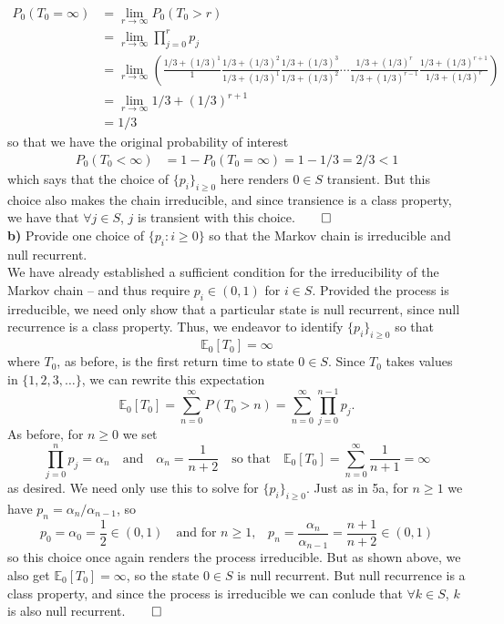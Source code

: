 \documentclass[11pt, letterpaper]{article}
\newcommand{\mbb}[1]{\mathbb{#1}}
\begin{document}
    \begin{align*}
        P_0(T_0=\infty)&=\lim_{r\rightarrow\infty}P_0(T_0>r)\\
        &=\lim_{r\rightarrow\infty}\prod_{j=0}^rp_j\\
        &=\lim_{r\rightarrow\infty}\left(\frac{1/3+(1/3)^1}{1}\frac{1/3+(1/3)^2}{1/3+(1/3)^1}\frac{1/3+(1/3)^3}{1/3+(1/3)^2}\cdots\frac{1/3+(1/3)^r}{1/3+(1/3)^{r-1}}\frac{1/3+(1/3)^{r+1}}{1/3+(1/3)^r}\right)\\
        &=\lim_{r\rightarrow\infty}1/3+(1/3)^{r+1}\\
        &=1/3
    \end{align*}
    so that we have the original probability of interest
    \begin{align*}
        P_0(T_0<\infty)&=1-P_0(T_0=\infty)
        =1-1/3
        =2/3
        <1
    \end{align*}
    which says that the choice of $\{p_i\}_{i\geq 0}$ here renders $0\in S$ transient. But this choice also makes the chain irreducible, and since transience is a class property, we have that $\forall j\in S$, $j$ is transient with this choice.\hfill{$\qed$}\\[10pt]
    {\bf b)} Provide one choice of $\{p_i:i\geq 0\}$ so that the Markov chain is irreducible and null recurrent.\\[10pt]
    We have already established a sufficient condition for the irreducibility of the Markov chain -- and thus require $p_i\in(0,1)$ for $i\in S$. Provided the process is irreducible, we need only show that a particular state is null recurrent, since
    null recurrence is a class property. Thus, we endeavor to identify $\{p_i\}_{i\geq 0}$ so that
    \[\mbb{E}_0\left[T_0\right]=\infty\]
    where $T_0$, as before, is the first return time to state $0\in S$. Since $T_0$ takes values in $\{1,2,3,\dots\}$, we can rewrite this expectation
    \[\mbb{E}_0\left[T_0\right]=\sum_{n=0}^\infty P(T_0>n)=\sum_{n=0}^\infty\prod_{j=0}^{n-1}p_j.\]
    As before, for $n\geq 0$ we set
    \[\prod_{j=0}^np_j=\alpha_n\quad\text{and}\quad\alpha_{n}=\frac{1}{n+2}\quad\text{so that}\quad\mbb{E}_0\left[T_0\right]=\sum_{n=0}^\infty\frac{1}{n+1}=\infty\]
    as desired. We need only use this to solve for $\{p_i\}_{i\geq 0}$. Just as in 5a, for $n\geq 1$ we have $p_n=\alpha_n/\alpha_{n-1}$, so
    \[p_0=\alpha_0=\frac{1}{2}\in(0,1)\quad\text{and for $n\geq 1$,}\quad p_n=\frac{\alpha_n}{\alpha_{n-1}}=\frac{n+1}{n+2}\in(0,1)\]
    so this choice once again renders the process irreducible. But as shown above, we also get $\mbb{E}_0\left[T_0\right]=\infty$, so the state $0\in S$ is null recurrent. But null recurrence is a class property, and since the process is irreducible we can conlude that $\forall k\in S$, $k$ is also null recurrent.\hfill{$\qed$}\\[10pt]
\end{document}
